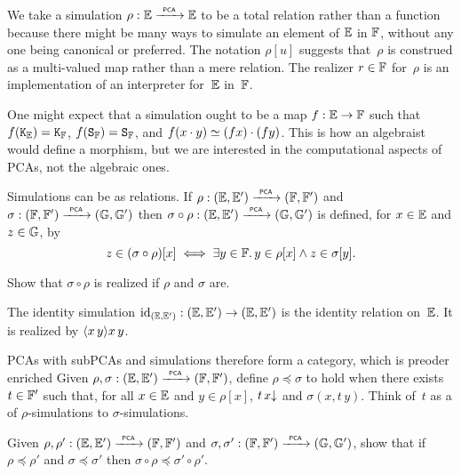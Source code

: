 We take a simulation $\rho : \EE \pcato \EE$ to be a total relation rather than a function because there might be many ways to simulate an element of $\EE$ in $\FF$, without any one being canonical or preferred. The notation $\rho[u]$ suggests that~$\rho$ is construed as a multi-valued map rather than a mere relation.
%
The realizer $r \in \FF$ for~$\rho$ is an implementation of an interpreter for~$\EE$ in~$\FF$.

One might expect that a simulation ought to be a map $f : \EE \to \FF$ such that $f(\combK_\EE) = \combK_\FF$, $f(\combS_\FF) = \combS_\FF$, and $f (x \cdot y) \kleq (f x) \cdot (f y)$. This is how an algebraist would define a morphism, but we are interested in the computational aspects of PCAs, not the algebraic ones.

%
%
%
Simulations can be  as relations.
If $\rho: (\EE, \subEE) \pcato (\FF, \subFF)$ and $\sigma: (\FF,
\subFF) \pcato (\GG, \subGG)$ then $\sigma \circ \rho: (\EE, \subEE)
\pcato (\GG, \subGG)$ is defined, for $x \in \EE$ and $z \in \GG$, by
%
\begin{equation*}
  z \in (\sigma \circ \rho)[x]
  \iff
  \some{y \in \FF} y \in \rho[x] \land z \in \sigma[y].
\end{equation*}

\begin{exercise}
  Show that $\sigma \circ \rho$ is realized if $\rho$ and $\sigma$ are.
\end{exercise}

The identity simulation $\id[(\EE, \subEE)]: (\EE,
\subEE) \to (\EE, \subEE)$ is the identity relation on~$\EE$. It is realized by $\pcalam{x\,y} x \, y$.

PCAs with subPCAs and simulations therefore form a category, which is preoder enriched
%
%
%
%
%
Given $\rho, \sigma : (\EE, \subEE) \pcato (\FF, \subFF)$, define $\rho \preceq \sigma$ to hold when
there exists $t \in \subFF$ such that, for all $x \in \EE$ and $y \in \rho[x]$, $\defined{t \, x}$ and $\sigma(x, t \, y)$.
Think of~$t$ as a  of $\rho$-simulations to
$\sigma$-simulations.

\begin{exercise}
  Given $\rho, \rho' : (\EE, \subEE) \pcato (\FF, \subFF)$ and $\sigma, \sigma' : (\FF, \subFF) \pcato (\GG, \subGG)$, show that if $\rho \preceq \rho'$ and $\sigma \preceq \sigma'$ then $\sigma \circ \rho \preceq \sigma' \circ \rho'$.
\end{exercise}

